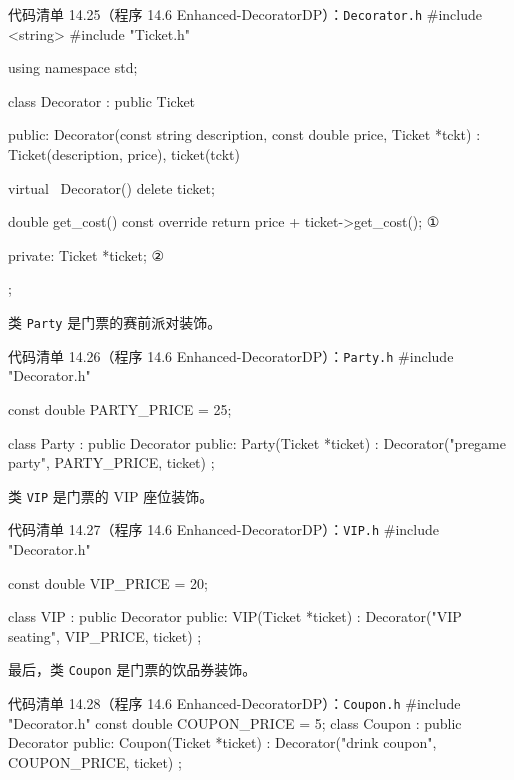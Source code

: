 \begin{codeboxt}{代码清单 14.25（程序 14.6 Enhanced-DecoratorDP）：\texttt{Decorator.\allowbreak{}h}}
#include <string>
#include "Ticket.h"

using namespace std;

class Decorator : public Ticket
{
public:
    Decorator(const string description, const double price,
              Ticket *tckt)
        : Ticket(description, price), ticket(tckt) {}

    virtual ~Decorator() { delete ticket; }

    double get_cost() const override
    {
        return price + ticket->get_cost(); ①
    }

private:
    Ticket *ticket;                         ②
};
\end{codeboxt}
\par
{}\par

类 \texttt{Party} 是门票的赛前派对装饰。

\begin{codeboxt}{代码清单 14.26（程序 14.6 Enhanced-DecoratorDP）：\texttt{Party.h}}
#include "Decorator.h"

const double PARTY_PRICE = 25;

class Party : public Decorator
{
public:
    Party(Ticket *ticket)
        : Decorator("pregame party", PARTY_PRICE, ticket) {}
};
\end{codeboxt}

类 \texttt{VIP} 是门票的 VIP 座位装饰。

\begin{codeboxt}{代码清单 14.27（程序 14.6 Enhanced-DecoratorDP）：\texttt{VIP.h}}
#include "Decorator.h"

const double VIP_PRICE = 20;

class VIP : public Decorator
{
public:
    VIP(Ticket *ticket)
        : Decorator("VIP seating", VIP_PRICE, ticket) {}
};
\end{codeboxt}

最后，类 \texttt{Coupon} 是门票的饮品券装饰。

\begin{codeboxt}{代码清单 14.28（程序 14.6 Enhanced-DecoratorDP）：\texttt{Coupon.h}}
#include "Decorator.h"
const double COUPON_PRICE = 5;
class Coupon : public Decorator
{
public:
    Coupon(Ticket *ticket)
        : Decorator("drink coupon", COUPON_PRICE, ticket) {}
};
\end{codeboxt}

